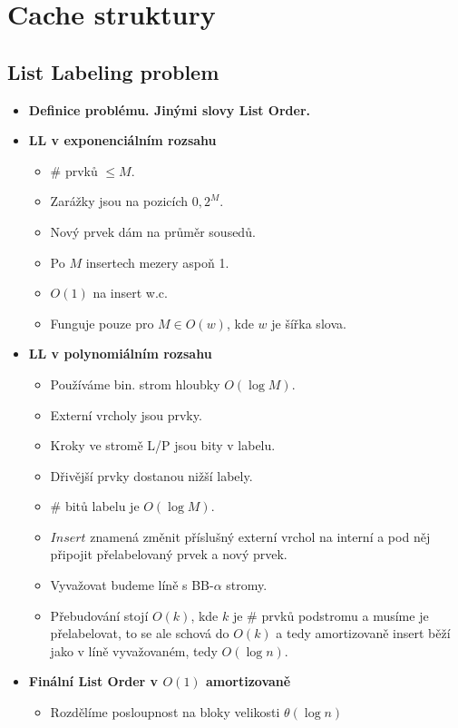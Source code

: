 \documentclass[11pt,a4paper]{article}
\begin{document}
\section{Cache struktury}
\subsection{List Labeling problem}
\begin{itemize}
    \item \textbf{Definice problému. Jinými slovy List Order.}
    \item \textbf{LL v exponenciálním rozsahu}
    \begin{itemize}
        \item \# prvků $\leq M$.
        \item Zarážky jsou na pozicích $0, 2^M$.
        \item Nový prvek dám na průměr sousedů.
        \item Po $M$ insertech mezery aspoň 1.
        \item $O(1)$ na insert w.c.
        \item Funguje pouze pro $M \in O(w)$, kde $w$ je šířka slova.
    \end{itemize}
    \item \textbf{LL v polynomiálním rozsahu}
    \begin{itemize}
        \item Používáme bin. strom hloubky $O(\log M)$.
        \item Externí vrcholy jsou prvky.
        \item Kroky ve stromě L/P jsou bity v labelu.
        \item Dřivější prvky dostanou nižší labely.
        \item \# bitů labelu je $O(\log M)$.
        \item $Insert$ znamená změnit příslušný externí vrchol na interní a pod něj připojit přelabelovaný prvek a nový prvek.
        \item Vyvažovat budeme líně s BB-$\alpha$ stromy.
        \item Přebudování stojí $O(k)$, kde $k$ je \# prvků podstromu a musíme je přelabelovat, to se ale schová do $O(k)$ a tedy amortizovaně insert běží jako v líně vyvažovaném, tedy $O(\log n)$. 
    \end{itemize}
    \item \textbf{Finální List Order v $O(1)$ amortizovaně}
    \begin{itemize}
        \item Rozdělíme posloupnost na bloky velikosti $\theta(\log n)$

\end{itemize}
\end{itemize}
\end{document}
